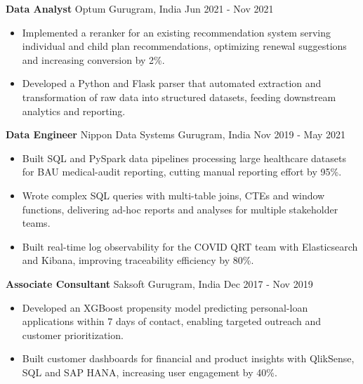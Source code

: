 \documentclass[10pt,a4paper]{article}
\newcommand{\role}[4]{\textbf{#1} \textbar{} #2 \hfill #3 \textbar{} #4\par}
\begin{document}
\vspace{3pt}
\role{Data Analyst}{Optum}{Gurugram, India}{Jun 2021 - Nov 2021}
\begin{itemize}
  \item Implemented a reranker for an existing recommendation system serving individual and child plan recommendations, optimizing renewal suggestions and increasing conversion by 2\%.
  \item Developed a Python and Flask parser that automated extraction and transformation of raw data into structured datasets, feeding downstream analytics and reporting.
\end{itemize}
\vspace{3pt}
\role{Data Engineer}{Nippon Data Systems}{Gurugram, India}{Nov 2019 - May 2021}
\begin{itemize}
  \item Built SQL and PySpark data pipelines processing large healthcare datasets for BAU medical-audit reporting, cutting manual reporting effort by 95\%.
  \item Wrote complex SQL queries with multi-table joins, CTEs and window functions, delivering ad-hoc reports and analyses for multiple stakeholder teams.
  \item Built real-time log observability for the COVID QRT team with Elasticsearch and Kibana, improving traceability efficiency by 80\%.
\end{itemize}
\vspace{3pt}
\role{Associate Consultant}{Saksoft}{Gurugram, India}{Dec 2017 - Nov 2019}
\begin{itemize}
  \item Developed an XGBoost propensity model predicting personal-loan applications within 7 days of contact, enabling targeted outreach and customer prioritization.
  \item Built customer dashboards for financial and product insights with QlikSense, SQL and SAP HANA, increasing user engagement by 40\%.
\end{itemize}
\end{document}
